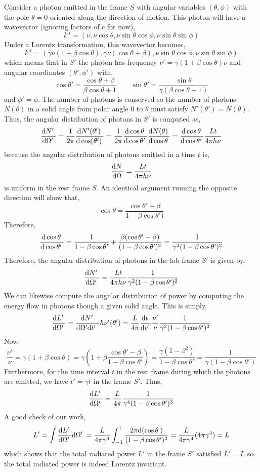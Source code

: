 \documentclass[12pt]{article}
\begin{document}
Consider a photon emitted in the frame $S$ with angular variables $(\theta, \phi)$ with the pole $\theta = 0$ oriented along the direction of motion. This photon will have a wavevector (ignoring factors of $c$ for now),
\[ k^\alpha = (\nu, \nu \cos{\theta}, \nu \sin{\theta} \cos{\phi}, \nu \sin{\theta} \sin{\phi} ) \]
Under a Lorentz transformation, this wavevector becomes,
\[ k^\alpha = (\gamma \nu (1 + \beta \cos{\theta}), \gamma \nu (\cos{\theta} + \beta), \nu \sin{\theta} \cos{\phi}, \nu \sin{\theta} \sin{\phi} ) \]
which means that in $S'$ the photon has frequency $\nu' = \gamma (1 + \beta \cos{\theta}) \nu$ and angular coordinates $(\theta', \phi')$ with,
\[ \cos{\theta'} = \frac{\cos{\theta} + \beta}{\beta \cos{\theta} + 1} \quad \quad \sin{\theta'} = \frac{\sin{\theta}}{\gamma(\beta \cos{\theta} + 1)} \]
and $\phi' = \phi$. The number of photons is conserved so the number of photons $N(\theta)$ in a solid angle from polar angle $0$ to $\theta$ must satisfy $N'(\theta') = N(\theta)$. Thus, the angular distribution of photons in $S'$ is computed as,
\[ \frac{\mathrm{d}N' \:}{\mathrm{d}\Omega' \:} = \frac{1}{2 \pi} \frac{\mathrm{d}N'(\theta') \:}{\mathrm{d}\cos(\theta') \:} = \frac{1}{2 \pi} \frac{\mathrm{d}\cos{\theta} \:}{\mathrm{d}\cos{\theta'} \:} \frac{\mathrm{d}N(\theta) \:}{\mathrm{d}\cos{\theta} \:} = \frac{\mathrm{d}\cos{\theta} \:}{\mathrm{d}\cos{\theta'} \:} \frac{L t}{4 \pi h \nu} \]
because the angular distribution of photons emitted in a time $t$ is,
\[ \frac{\mathrm{d}N \:}{\mathrm{d}\Omega \:} = \frac{L t}{4 \pi h \nu} \]
is uniform in the rest frame $S$. An identical argument running the opposite direction will show that,
\[ \cos{\theta} = \frac{\cos{\theta'} - \beta}{1 - \beta \cos{\theta'})} \] 
Therefore,
\begin{align*}
\frac{\mathrm{d}\cos{\theta} \:}{\mathrm{d}\cos{\theta'} \:} = \frac{1}{1 - \beta \cos{\theta'}} + \frac{\beta(\cos{\theta'} - \beta)}{(1 - \beta \cos{\theta'})^2} = \frac{1}{\gamma^2(1 - \beta \cos{\theta'})^2}  
\end{align*}
Therefore, the angular distribution of photons in the lab frame $S'$ is given by,
\[ \frac{\mathrm{d}N' \:}{\mathrm{d}\Omega' \:} = \frac{Lt}{4 \pi h \nu} \frac{1}{\gamma^2 (1 - \beta \cos{\theta'})^2} \]
We can likewise compute the angular distribution of power by computing the energy flow in photons though a given solid angle. This is simply,
\[ \frac{\mathrm{d}L' \:}{\mathrm{d}\Omega' \:} = \frac{\mathrm{d}N' \:}{\mathrm{d}\Omega' \mathrm{d}t' \: \:} h \nu'(\theta') = \frac{L}{4 \pi} \frac{\mathrm{d}t \:}{\mathrm{d}t' \:} \frac{\nu'}{\nu} \frac{1}{\gamma^2 (1 - \beta \cos{\theta'})^2} \]
Now,
\[ \frac{\nu'}{\nu} = \gamma(1 + \beta \cos{\theta}) = \gamma \left( 1 + \beta \frac{\cos{\theta'} - \beta}{1 - \beta \cos{\theta'}} \right) = \frac{\gamma(1 - \beta^2)}{1 - \beta \cos{\theta'}} = \frac{1}{\gamma(1 - \beta \cos{\theta'})} \]
Furthermore, for the time interval $t$ in the rest frame during which the photons are emitted, we have $t' = \gamma t$ in the frame $S'$.
Thus,
\[ \frac{\mathrm{d}L' \:}{\mathrm{d}\Omega' \:} = \frac{L}{4 \pi} \frac{1}{\gamma^4 (1 - \beta \cos{\theta'})^3} \]
A good check of our work,
\[ L' = \int \frac{\mathrm{d}L' \:}{\mathrm{d}\Omega' \:} \mathrm{d}\Omega' \: = \frac{L}{4 \pi \gamma^4} \int_{-1}^{1} \frac{2 \pi\mathrm{d}(\cos{\theta} \:)}{(1 - \beta \cos{\theta'})^3} = \frac{L}{4 \pi \gamma^4} (4 \pi \gamma^4) = L \]
which shows that the total radiated power $L'$ in the frame $S'$ satisfied $L' = L$ so the total radiated power is indeed Lorentz invariant. 
\end{document}
